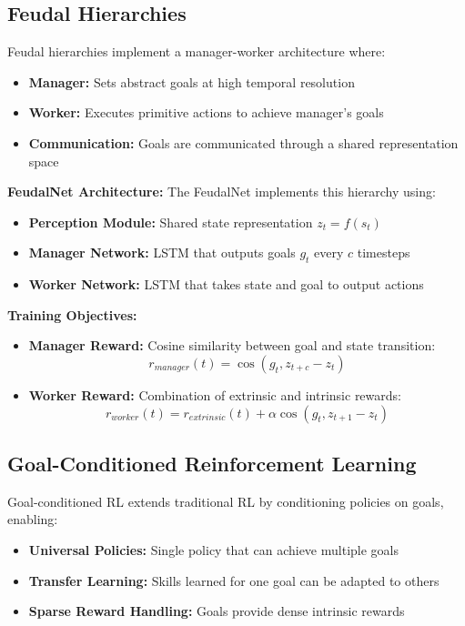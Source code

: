 \documentclass[12pt]{article}
\begin{document}
{{\subsection{Feudal Hierarchies}

Feudal hierarchies implement a manager-worker architecture where:
\begin{itemize}
    \item \textbf{Manager:} Sets abstract goals at high temporal resolution
    \item \textbf{Worker:} Executes primitive actions to achieve manager's goals
    \item \textbf{Communication:} Goals are communicated through a shared representation space
\end{itemize}

\textbf{FeudalNet Architecture:}
The FeudalNet implements this hierarchy using:
\begin{itemize}
    \item \textbf{Perception Module:} Shared state representation $z_t = f(s_t)$
    \item \textbf{Manager Network:} LSTM that outputs goals $g_t$ every $c$ timesteps
    \item \textbf{Worker Network:} LSTM that takes state and goal to output actions
\end{itemize}

\textbf{Training Objectives:}
\begin{itemize}
    \item \textbf{Manager Reward:} Cosine similarity between goal and state transition:
    \[
    r_{manager}(t) = \cos(g_t, z_{t+c} - z_t)
    \]
    \item \textbf{Worker Reward:} Combination of extrinsic and intrinsic rewards:
    \[
    r_{worker}(t) = r_{extrinsic}(t) + \alpha \cos(g_t, z_{t+1} - z_t)
    \]
\end{itemize}

\subsection{Goal-Conditioned Reinforcement Learning}

Goal-conditioned RL extends traditional RL by conditioning policies on goals, enabling:
\begin{itemize}
    \item \textbf{Universal Policies:} Single policy that can achieve multiple goals
    \item \textbf{Transfer Learning:} Skills learned for one goal can be adapted to others
    \item \textbf{Sparse Reward Handling:} Goals provide dense intrinsic rewards
\end{itemize}

}}
\end{document}
